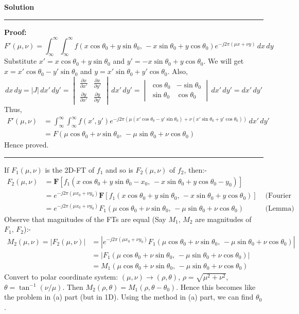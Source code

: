 \documentclass[a4paper,12pt]{article}
\newenvironment{solution}[2][]{%
\begin{mdframed}[linecolor=blue!70!black, linewidth=2pt, roundcorner=10pt, backgroundcolor=yellow!10!white, skipabove=12pt, skipbelow=12pt]%
	\textbf{\large #2}
	\par\noindent\rule{\textwidth}{0.4pt}
}{
\end{mdframed}
}
\begin{document}
\begin{solution}{Solution}
	\textbf{Proof:}
	\[
		F'(\mu, \nu) =\int_{\infty}^{\infty} \int_{\infty}^{\infty} f(x \cos \theta_0 + y \sin \theta_0, \, - x \sin \theta_0 + y \cos \theta_0) e^{-j2\pi (\mu x + \nu y)} \, dx \, dy
	\]
	Substitute $x' = x \cos \theta_0 + y \sin \theta_0$ and $y' = - x \sin \theta_0 + y \cos \theta_0$. We will get $x = x' \cos \theta_0 - y' \sin \theta_0$ and $y = x' \sin \theta_0 + y' \cos \theta_0$. Also,
	\[
		dx \, dy = |J| \, dx' \, dy' = \begin{vmatrix}
			\frac{\partial x}{\partial x'} & \frac{\partial x}{\partial y'} \\
			\frac{\partial y}{\partial x'} & \frac{\partial y}{\partial y'}
		\end{vmatrix} \, dx' \, dy' = \begin{vmatrix}
			\cos \theta_0 & -\sin \theta_0 \\
			\sin \theta_0 & \cos \theta_0
		\end{vmatrix} \, dx' \, dy' = dx' \, dy'
	\]
	Thus,
	\begin{align*}
		F'(\mu, \nu) &= \int_{\infty}^{\infty} \int_{\infty}^{\infty} f(x', y') e^{-j2\pi (\mu (x' \cos \theta_0 - y' \sin \theta_0) + \nu (x' \sin \theta_0 + y' \cos \theta_0))} \, dx' \, dy' \\
		&= F(\mu \cos \theta_0 + \nu \sin \theta_0, \, - \mu \sin \theta_0 + \nu \cos \theta_0)
	\end{align*}
	Hence proved.
	\vspace{5pt}
	\hrule
	\vspace{5pt}
	If $F_1(\mu, \nu)$ is the 2D-FT of $f_1$ and so is $F_2(\mu, \nu)$ of $f_2$, then:-
	\begin{align*}
		F_2(\mu, \nu) &= \mathbf{F} [f_1(x \cos \theta_0 + y \sin \theta_0 - x_0, \, - x \sin \theta_0 + y \cos \theta_0 - y_0)] \\
		&= e^{-j2\pi (\mu x_0 + \nu y_0)} \mathbf{F} [f_1(x \cos \theta_0 + y \sin \theta_0, \, - x \sin \theta_0 + y \cos \theta_0)] &\text{ (Fourier Shift Theorem)}\\
		&= e^{-j2\pi (\mu x_0 + \nu y_0)} F_1(\mu \cos \theta_0 + \nu \sin \theta_0, \, - \mu \sin \theta_0 + \nu \cos \theta_0) &\text{ (Lemma)}
	\end{align*}
	Observe that magnitudes of the FTs are equal (Say $M_1, \, M_2$ are magnitudes of $F_1, \, F_2$):-
	\begin{align*}
		M_2(\mu, \nu) = |F_2(\mu, \nu)| &= |e^{-j2\pi (\mu x_0 + \nu y_0)} F_1(\mu \cos \theta_0 + \nu \sin \theta_0, \, - \mu \sin \theta_0 + \nu \cos \theta_0)| \\
		&= |F_1(\mu \cos \theta_0 + \nu \sin \theta_0, \, - \mu \sin \theta_0 + \nu \cos \theta_0)| \\
		&= M_1(\mu \cos \theta_0 + \nu \sin \theta_0, \, - \mu \sin \theta_0 + \nu \cos \theta_0)
	\end{align*}
	Convert to polar coordinate system: $(\mu, \nu) \rightarrow (\rho, \theta)$, $\rho = \sqrt{\mu^2 + \nu^2}$, $\theta = \tan^{-1}(\nu/\mu)$. Then $M_2(\rho, \theta) = M_1(\rho, \theta - \theta_0)$. Hence this becomes like the problem in (a) part (but in 1D). Using the method in (a) part, we can find $\theta_0$.


\end{solution}
\end{document}
